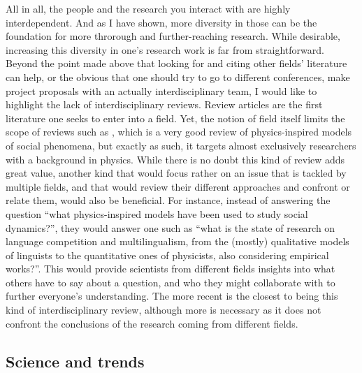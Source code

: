 \documentclass[../thesis.tex]{subfiles}
\begin{document}
All in all, the people and the research you interact with are highly interdependent. And
as I have shown, more diversity in those can be the foundation for more throrough and
further-reaching research. While desirable, increasing this diversity in one's research
work is far from straightforward. Beyond the point made above that looking for and
citing other fields' literature can help, or the obvious that one should try to go to
different conferences, make project proposals with an actually interdisciplinary team, I
would like to highlight the lack of interdisciplinary reviews. Review articles are the
first literature one seeks to enter into a field. Yet, the notion of field itself limits
the scope of reviews such as \cite{CastellanoStatisticalPhysics2009}, which is a very
good review of physics-inspired models of social phenomena, but exactly as such, it
targets almost exclusively researchers with a background in physics. While there is no
doubt this kind of review adds great value, another kind that would focus rather on an
issue that is tackled by multiple fields, and that would review their different
approaches and confront or relate them, would also be beneficial. For instance, instead
of answering the question ``what physics-inspired models have been used to study social
dynamics?'', they would answer one such as ``what is the state of research on language
competition and multilingualism, from the (mostly) qualitative models of linguists to
the quantitative ones of physicists, also considering empirical works?''. This would
provide scientists from different fields insights into  what others have to say about a
question, and who they might collaborate with to further everyone's understanding. The
more recent \cite{BoissonneaultSystematicInterdisciplinary2021} is the closest to being
this kind of interdisciplinary review, although more is necessary as it does not
confront the conclusions of the research coming from different fields.


\subsection{Science and trends}
\end{document}
